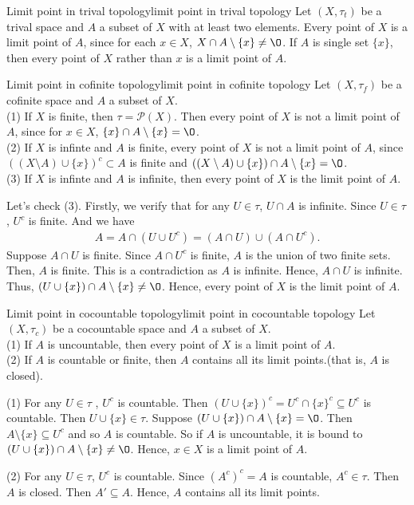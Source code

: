\begin{example}{Limit point in trival topology}{limit point in trival topology}
    Let $(X,\tau_t)$ be a trival space and $A$ a subset of $X$ with at least two elements. Every point of $X$ is a limit point of $A$, 
    since for each $x\in X$, $X\cap A\setminus\{x\}\neq\O$. If $A$ is single set $\{x\}$, then every point of $X$ rather than $x$ is a limit point of $A$.
\end{example}

\begin{example}{Limit point in cofinite topology}{limit point in cofinite topology}
    Let $(X,\tau_f)$ be a cofinite space and $A$ a subset of $X$. \\
    (1) If $X$ is finite, then $\tau = \mathcal{P}(X)$. Then every point of $X$ is not a limit point of $A$, since for $x\in X$, $\{x\} \cap A\setminus\{x\}=\O$.\\
    (2) If $X$ is infinte and $A$ is finite, every point of $X$ is not a limit point of $A$, since $((X\setminus A) \cup\{x\})^c\subset A$ is finite and $((X\setminus A) \cup\{x\})\cap A\setminus \{x\}=\O$.\\
    (3) If $X$ is infinte and $A$ is infinite, then every point of $X$ is the limit point of $A$.
\end{example}
    Let's check (3). Firstly, we verify that for any $U\in \tau$, $U\cap A$ is infinite. Since $U\in\tau$, $U^c$ is finite. And
    we have 
    \begin{align*}
        A = A\cap(U\cup U^c) = (A\cap U)\cup (A\cap U^c).
    \end{align*}
    Suppose $A\cap U$ is finite. Since $A\cap U^c$ is finite,
    $A$ is the union of two finite sets. Then, $A$ is finite. This is a contradiction as $A$ is infinite.
    Hence, $A\cap U$ is infinite.
    Thus, $(U\cup \{x\})\cap A\setminus\{x\}\neq \O$. Hence, every point of $X$ is the limit point of $A$.

\begin{example}{Limit point in cocountable topology}{limit point in cocountable topology}
    Let $(X,\tau_c)$ be a cocountable space and $A$ a subset of $X$.\\
    (1) If $A$ is uncountable, then every point of $X$ is a limit point of $A$.\\
    (2) If $A$ is countable or finite, then $A$ contains all its limit points.(that is, $A$ is closed).
\end{example}
    (1) For any $U\in \tau$ , $U^c$ is countable. 
    Then $(U\cup \{x\})^c = U^c\cap \{x\}^c\subseteq U^c$ is countable. Then $U\cup \{x\}\in\tau$. 
    Suppose $(U\cup \{x\})\cap A\setminus \{x\} = \O$. Then $A\setminus \{x\}\subseteq U^c$ and so $A$ is countable.
    So if $A$ is uncountable, it is bound to $(U\cup \{x\})\cap A\setminus\{x\}\neq \O$. Hence, $x\in X$ is a limit point of $A$.
    \par
    (2) For any $U\in \tau$, $U^c$ is countable. Since $(A^c)^c=A$ is countable, $A^c\in\tau$. Then $A$ is closed. Then $A'\subseteq A$.
    Hence, $A$ contains all its limit points.  




